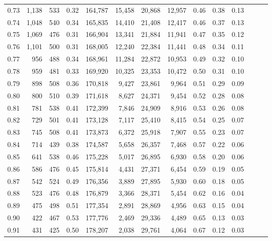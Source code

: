 \begin{tabular}{rrrrrrrrrrrrrr}
0.73 &  1,138 &  533 &  0.32 &  164,787 &   15,458 &  20,868 &  12,957 &  0.46 &  0.38 &      0.13 \\
0.74 &  1,048 &  540 &  0.34 &  165,835 &   14,410 &  21,408 &  12,417 &  0.46 &  0.37 &      0.13 \\
0.75 &  1,069 &  476 &  0.31 &  166,904 &   13,341 &  21,884 &  11,941 &  0.47 &  0.35 &      0.12 \\
0.76 &  1,101 &  500 &  0.31 &  168,005 &   12,240 &  22,384 &  11,441 &  0.48 &  0.34 &      0.11 \\
0.77 &    956 &  488 &  0.34 &  168,961 &   11,284 &  22,872 &  10,953 &  0.49 &  0.32 &      0.10 \\
0.78 &    959 &  481 &  0.33 &  169,920 &   10,325 &  23,353 &  10,472 &  0.50 &  0.31 &      0.10 \\
0.79 &    898 &  508 &  0.36 &  170,818 &    9,427 &  23,861 &   9,964 &  0.51 &  0.29 &      0.09 \\
0.80 &    800 &  510 &  0.39 &  171,618 &    8,627 &  24,371 &   9,454 &  0.52 &  0.28 &      0.08 \\
0.81 &    781 &  538 &  0.41 &  172,399 &    7,846 &  24,909 &   8,916 &  0.53 &  0.26 &      0.08 \\
0.82 &    729 &  501 &  0.41 &  173,128 &    7,117 &  25,410 &   8,415 &  0.54 &  0.25 &      0.07 \\
0.83 &    745 &  508 &  0.41 &  173,873 &    6,372 &  25,918 &   7,907 &  0.55 &  0.23 &      0.07 \\
0.84 &    714 &  439 &  0.38 &  174,587 &    5,658 &  26,357 &   7,468 &  0.57 &  0.22 &      0.06 \\
0.85 &    641 &  538 &  0.46 &  175,228 &    5,017 &  26,895 &   6,930 &  0.58 &  0.20 &      0.06 \\
0.86 &    586 &  476 &  0.45 &  175,814 &    4,431 &  27,371 &   6,454 &  0.59 &  0.19 &      0.05 \\
0.87 &    542 &  524 &  0.49 &  176,356 &    3,889 &  27,895 &   5,930 &  0.60 &  0.18 &      0.05 \\
0.88 &    523 &  476 &  0.48 &  176,879 &    3,366 &  28,371 &   5,454 &  0.62 &  0.16 &      0.04 \\
0.89 &    475 &  498 &  0.51 &  177,354 &    2,891 &  28,869 &   4,956 &  0.63 &  0.15 &      0.04 \\
0.90 &    422 &  467 &  0.53 &  177,776 &    2,469 &  29,336 &   4,489 &  0.65 &  0.13 &      0.03 \\
0.91 &    431 &  425 &  0.50 &  178,207 &    2,038 &  29,761 &   4,064 &  0.67 &  0.12 &      0.03 \\

\end{tabular}
